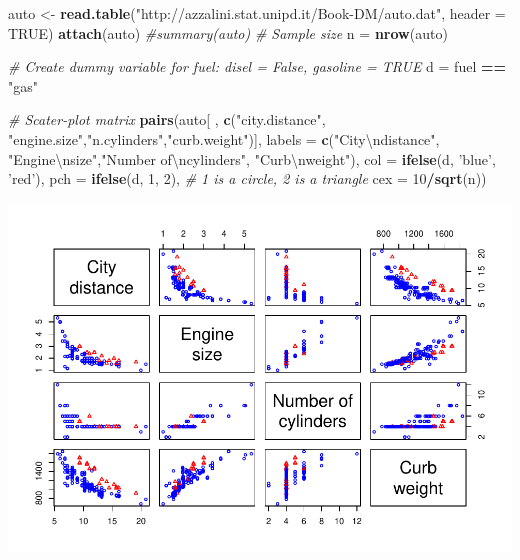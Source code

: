 \documentclass[
]{article}
\newenvironment{Shaded}{\begin{snugshade}}{\end{snugshade}}
\newcommand{\CharTok}[1]{\textcolor[rgb]{0.31,0.60,0.02}{#1}}
\newcommand{\CommentTok}[1]{\textcolor[rgb]{0.56,0.35,0.01}{\textit{#1}}}
\newcommand{\DataTypeTok}[1]{\textcolor[rgb]{0.13,0.29,0.53}{#1}}
\newcommand{\DecValTok}[1]{\textcolor[rgb]{0.00,0.00,0.81}{#1}}
\newcommand{\KeywordTok}[1]{\textcolor[rgb]{0.13,0.29,0.53}{\textbf{#1}}}
\newcommand{\NormalTok}[1]{#1}
\newcommand{\OperatorTok}[1]{\textcolor[rgb]{0.81,0.36,0.00}{\textbf{#1}}}
\newcommand{\OtherTok}[1]{\textcolor[rgb]{0.56,0.35,0.01}{#1}}
\newcommand{\StringTok}[1]{\textcolor[rgb]{0.31,0.60,0.02}{#1}}
\begin{document}
\begin{Shaded}
\begin{Highlighting}[]
\NormalTok{auto <-}\StringTok{ }\KeywordTok{read.table}\NormalTok{(}\StringTok{"http://azzalini.stat.unipd.it/Book-DM/auto.dat"}\NormalTok{, }\DataTypeTok{header =} \OtherTok{TRUE}\NormalTok{)}
\KeywordTok{attach}\NormalTok{(auto)}
\CommentTok{#summary(auto)}
\CommentTok{# Sample size}
\NormalTok{n =}\StringTok{ }\KeywordTok{nrow}\NormalTok{(auto)}

\CommentTok{# Create dummy variable for fuel: disel = False, gasoline = TRUE}
\NormalTok{d =}\StringTok{ }\NormalTok{fuel }\OperatorTok{==}\StringTok{ "gas"}


\CommentTok{# Scater-plot matrix}
\KeywordTok{pairs}\NormalTok{(auto[ , }\KeywordTok{c}\NormalTok{(}\StringTok{"city.distance"}\NormalTok{, }\StringTok{"engine.size"}\NormalTok{,}\StringTok{"n.cylinders"}\NormalTok{,}\StringTok{"curb.weight"}\NormalTok{)],     }
      \DataTypeTok{labels =} \KeywordTok{c}\NormalTok{(}\StringTok{"City}\CharTok{\textbackslash{}n}\StringTok{distance"}\NormalTok{, }\StringTok{"Engine}\CharTok{\textbackslash{}n}\StringTok{size"}\NormalTok{,}\StringTok{"Number of}\CharTok{\textbackslash{}n}\StringTok{cylinders"}\NormalTok{, }\StringTok{"Curb}\CharTok{\textbackslash{}n}\StringTok{weight"}\NormalTok{),}
      \DataTypeTok{col =} \KeywordTok{ifelse}\NormalTok{(d, }\StringTok{'blue'}\NormalTok{, }\StringTok{'red'}\NormalTok{), }\DataTypeTok{pch =} \KeywordTok{ifelse}\NormalTok{(d, }\DecValTok{1}\NormalTok{, }\DecValTok{2}\NormalTok{), }\CommentTok{# 1 is a circle, 2 is a triangle}
      \DataTypeTok{cex =} \DecValTok{10}\OperatorTok{/}\KeywordTok{sqrt}\NormalTok{(n))}
\end{Highlighting}
\end{Shaded}

\includegraphics{fromBook_files/figure-latex/unnamed-chunk-1-1.pdf}
\end{document}

